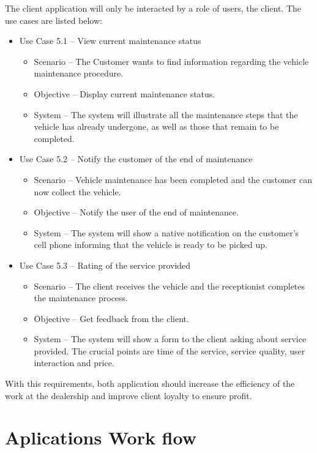 The client application will only be interacted by a role of users, the client.
The use cases are listed below:

\begin{itemize}
  \item Use Case 5.1 – View current maintenance status
  \begin{itemize}
    \item Scenario – The Customer wants to find information regarding the vehicle maintenance procedure.
    \item Objective – Display current maintenance status.
    \item System – The system will illustrate all the maintenance steps that the vehicle has already undergone, as well as those that remain to be completed. 
  \end{itemize}
  \item Use Case 5.2 – Notify the customer of the end of maintenance 
  \begin{itemize}
    \item Scenario – Vehicle maintenance has been completed and the customer can now collect the vehicle.
    \item Objective – Notify the user of the end of maintenance.
    \item System – The system will show a native notification on the customer's cell phone informing that the vehicle is ready to be picked up. 
  \end{itemize}
  \item Use Case 5.3 – Rating of the service provided
  \begin{itemize}
    \item Scenario – The client receives the vehicle and the receptionist completes the maintenance process.
    \item Objective – Get feedback from the client.
    \item System – The system will show a form to the client asking about service provided. The crucial points are time of the service, service quality, user interaction and price.
  \end{itemize}
\end{itemize}
\hfill \break

With this requirements, both application should increase the efficiency of the work at the dealership and improve client loyalty to ensure profit.


\section{Aplications Work flow}

